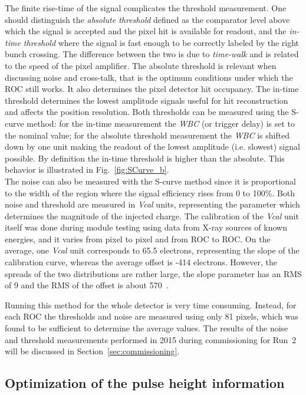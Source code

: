 The finite rise-time of the signal complicates the threshold measurement. 
One should distinguish the \textit{absolute threshold} defined as the comparator level above which the signal is accepted and the pixel hit is available for readout, and the \textit{in-time threshold} where the signal is fast enough to be correctly labeled by the right bunch crossing.
The difference between the two is due to \textit{time-walk} and is related to the speed of the pixel amplifier.
The absolute threshold is relevant when discussing noise and cross-talk, that is the optimum conditions under which the ROC still works. It also determines the pixel detector hit occupancy.
The in-time threshold determines the lowest amplitude signals useful for hit reconstruction and affects the position resolution.
Both thresholds can be measured using the S-curve method: for the in-time measurement the \textit{WBC} (or trigger delay) is set to the nominal value; for the absolute threshold measurement the \textit{WBC} is shifted down by one unit making the readout of the lowest amplitude (i.e. slowest) signal possible. By definition the in-time threshold is higher than the absolute. This behavior is illustrated in Fig.~\ref{fig:SCurve_b}.\\

The noise can also be measured with the S-curve method since it is proportional to the width of the region where the signal efficiency rises from 0 to 100\%.
Both noise and threshold are measured in \textit{Vcal} units, representing the parameter which determines the magnitude of the injected charge.
The calibration of the \textit{Vcal} unit itself was done during module testing using data from X-ray sources of known energies, and it varies from pixel to pixel and from ROC to ROC.
On the average, one \textit{Vcal} unit corresponds to 65.5 electrons, representing the slope of the calibration curve, whereas the average offset is -414 electrons.
However, the spreads of the two distributions are rather large, the slope parameter has an RMS of 9 and the RMS of the offset is about 570~\cite{1748-0221-4-03-P03019}.

Running this method for the whole detector is very time consuming. Instead, for each ROC the thresholds and noise are measured using only 81 pixels, which was found to be sufficient to determine the average values.
The results of the noise and threshold measurements performed in 2015 during commissioning for Run~2 will be discussed in Section~\ref{sec:commissioning}.

\subsection{Optimization of the pulse height information}\label{subsec:calibPart2}

